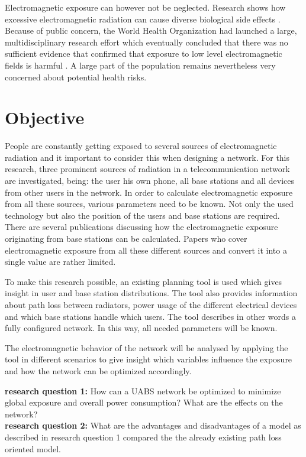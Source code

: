 Electromagnetic exposure can however not be neglected. Research shows how excessive electromagnetic radiation can cause diverse biological side effects \cite{bioeffects}.
Because of public concern, the World Health Organization had launched a large, multidisciplinary research effort which eventually concluded that there was no sufficient evidence that confirmed 
that exposure to low level electromagnetic fields is harmful \cite{WHO}. A large part of the population remains nevertheless very concerned about potential health risks.

\section{Objective}
\label{sec:objective}
People are constantly getting exposed to several sources of electromagnetic radiation and it important to consider this when designing a network. For this research, three prominent sources of radiation in a telecommunication
network are investigated, being: the user his own phone, all base stations and all devices from other users in the network. In order to calculate electromagnetic 
exposure from all these sources, various parameters need to be known. Not only the used technology but also the position of the users and base stations 
are required. There are several publications discussing how the electromagnetic exposure originating from base stations can be calculated. 
Papers who cover electromagnetic exposure from all these different sources and convert it into a single value are rather limited.

To make this research possible, an existing planning tool is used which gives insight in user and base station distributions.
The tool also provides information about path loss between radiators, power usage of the different electrical devices and which base stations handle which users. The tool describes in other words a fully configured network.
In this way, all needed parameters will be known.

The electromagnetic behavior of the network will be analysed by applying the tool in different scenarios to give insight which variables influence the exposure and how
the network can be optimized accordingly. 

\textbf{research question 1:} How can a \gls{UABS} network be optimized to minimize global exposure and overall power consumption? What are the effects on the network?\\

\textbf{research question 2:} What are the advantages and disadvantages of a model as described in research question 1 compared the the already existing path loss oriented model.\\

